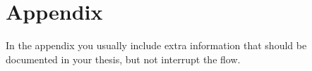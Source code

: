 \chapter{Appendix}
\label{sec:app}

In the appendix you usually include extra information that should be
documented in your thesis, but not interrupt the flow.

